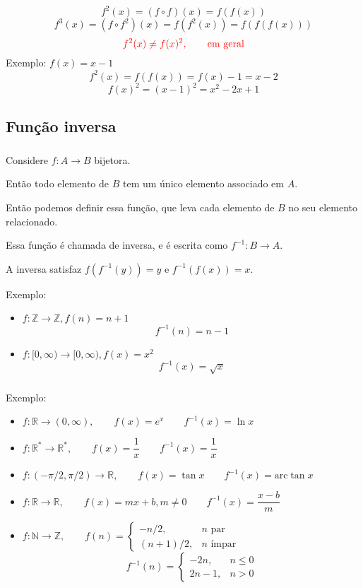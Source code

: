 \documentclass[10 pt]{beamer}
\newcommand{\makesubsection}[1]{\subsection[#1]{#1}}
\newcommand{\myframe}[1]{
\begin{frame}
 \frametitle{\insertsection \qquad {\small \insertsubsection}}
#1
\end{frame}}
\newcommand{\spc}{\vspace{0.5 cm}}
\begin{document}
\myframe {
  $$ f^2(x) = (f\circ f)(x) = f(f(x)) $$
  $$ f^3(x) = (f\circ f^2)(x) = f(f^2(x)) = f(f(f(x))) $$
  \spc
  \pause
  $$ {\color{red} f^2(x) \neq f(x)^2, \qquad \mbox{em geral}} $$
  Exemplo: $f(x) = x - 1$
    $$ f^2(x) = f(f(x)) = f(x) - 1 = x - 2 $$
    $$ f(x)^2 = (x - 1)^2 = x^2 - 2x + 1 $$
}

\makesubsection{Função inversa}

\myframe {
  Considere $f:A\rightarrow B$ bijetora.

  Então todo elemento de $B$ tem um único elemento associado em $A$.

  Então podemos definir essa função, que leva cada elemento de $B$ no
  seu elemento relacionado.

  Essa função é chamada de inversa, e é escrita como $f^{-1}:B \rightarrow A$.

  A inversa satisfaz $f(f^{-1}(y)) = y$ e $f^{-1}(f(x)) = x$.

  Exemplo:
  \begin{itemize}
    \item $f:\mathbb{Z}\rightarrow\mathbb{Z}, f(n) = n + 1$
      $$f^{-1}(n) = n - 1$$
    \item $f:[0,\infty)\rightarrow[0,\infty), f(x) = x^2$
      $$f^{-1}(x) = \sqrt{x}$$
  \end{itemize}
}

\myframe {
  Exemplo:
  \begin{itemize}
    \item $f:\mathbb{R}\rightarrow(0,\infty), 
      \qquad f(x) = e^x
      \qquad f^{-1}(x) = \ln x $
    \item $f:\mathbb{R}^*\rightarrow\mathbb{R}^*, 
      \qquad f(x) = \dfrac{1}{x}
      \qquad f^{-1}(x) = \dfrac{1}{x} $
    \item $f:(-\pi/2,\pi/2)\rightarrow\mathbb{R}, 
      \qquad f(x) = \tan x
      \qquad f^{-1}(x) = \mbox{arc}\tan x $
    \item $f:\mathbb{R}\rightarrow\mathbb{R}, 
      \qquad f(x) = mx + b, m \neq 0
      \qquad f^{-1}(x) = \dfrac{x - b}{m} $
    \item $f:\mathbb{N}\rightarrow\mathbb{Z},
      \qquad f(n) = \left\{
        \begin{array}{ll}
          -n/2, & n\mbox{ par} \\
          (n+1)/2 , & n\mbox{ ímpar}
        \end{array}\right.$
        $$f^{-1}(n) = \left\{
        \begin{array}{ll}
          -2n, & n \leq 0 \\
          2n - 1, & n > 0
        \end{array}\right.$$
  \end{itemize}
}
\end{document}
